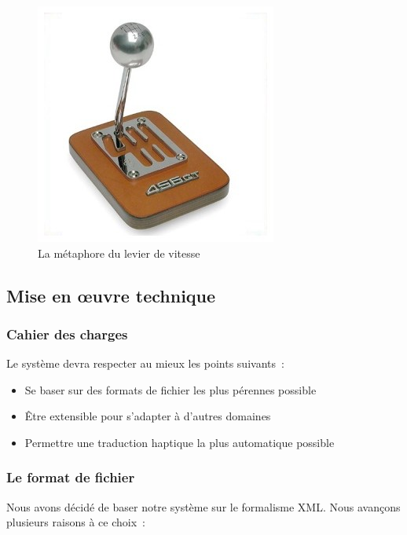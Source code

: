 \documentclass[
]{book}
\providecommand{\tightlist}{%
  \setlength{\itemsep}{0pt}\setlength{\parskip}{0pt}}
\begin{document}
\begin{figure}
\centering
\includegraphics{img/levier.jpg}
\caption{\label{fig:levier}La métaphore du levier de vitesse}
\end{figure}

\hypertarget{mise-en-ux153uvre-technique}{%
\subsection{Mise en œuvre technique}\label{mise-en-ux153uvre-technique}}

\hypertarget{cahier-des-charges}{%
\subsubsection{Cahier des charges}\label{cahier-des-charges}}

Le système devra respecter au mieux les points suivants~:

\begin{itemize}
\tightlist
\item
  Se baser sur des formats de fichier les plus
  pérennes possible
\item
  Être extensible pour s'adapter à d'autres
  domaines
\item
  Permettre une traduction haptique la plus
  automatique possible
\end{itemize}

\hypertarget{le-format-de-fichier}{%
\subsubsection{Le format de fichier}\label{le-format-de-fichier}}

Nous avons décidé de baser notre système sur le formalisme XML. Nous
avançons plusieurs raisons à ce choix~:
\end{document}
